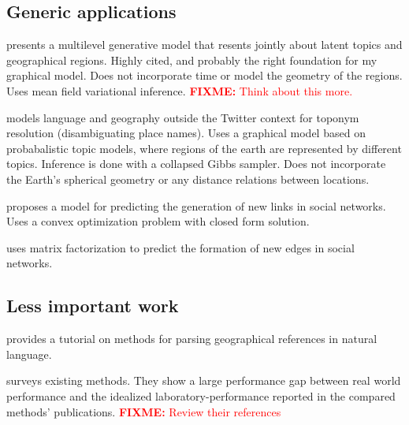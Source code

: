 \documentclass[sigconf,10pt]{acmart}
\newcommand{\fixme}[1]{\textcolor{red}{\textbf{FIXME:} {#1}}}
\begin{document}
\subsection{Generic applications}

\citet{eisenstein2010latent} presents a multilevel generative model that resents jointly about latent topics and geographical regions.
Highly cited, and probably the right foundation for my graphical model.
Does not incorporate time or model the geometry of the regions.
Uses mean field variational inference.
\fixme{Think about this more.}

\citet{speriosu2010connecting} models language and geography outside the Twitter context for toponym resolution (disambiguating place names).
Uses a graphical model based on probabalistic topic models,
where regions of the earth are represented by different topics.
Inference is done with a collapsed Gibbs sampler.
Does not incorporate the Earth's spherical geometry or any distance relations between locations.

\citet{wu2017link} proposes a model for predicting the generation of new links in social networks. 
Uses a convex optimization problem with closed form solution.

\citet{yu2017temporally} uses matrix factorization to predict the formation of new edges in social networks.


\subsection{Less important work}

\citet{leidner2011detecting} provides a tutorial on methods for parsing geographical references in natural language.

\citet{jurgens2015geolocation} surveys existing methods.
They show a large performance gap between real world performance and the idealized laboratory-performance reported in the compared methods' publications.
\fixme{Review their references}


%
%
\end{document}
